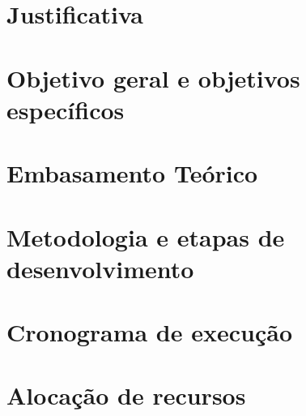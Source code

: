 \documentclass[
	12pt,				%
	openright,			%
	oneside,			%
	a4paper,			%
	chapter=TITLE,		%
	section=TITLE,		%
	english,			%
	french,				%
	spanish,			%
	brazil				%
	]{abntex2}
\begin{document}
\chapter[Justificativa]{Justificativa}


\chapter[Objetivo geral e objetivos específicos]{Objetivo geral e objetivos específicos}


\chapter[Embasamento Teórico]{Embasamento Teórico}


\chapter[Metodologia e etapas de desenvolvimento]{Metodologia e etapas de desenvolvimento}


\chapter[Cronograma de execução]{Cronograma de execução}


\chapter[Alocação de recursos
]{Alocação de recursos}



\postextual


\renewcommand{\bibname}{Referências Bibliográficas}



\begin{apendicesenv}
\partapendices


\end{apendicesenv}
\end{document}
